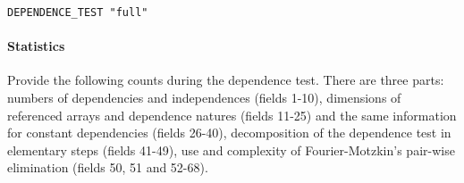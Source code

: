\begin{verbatim}
DEPENDENCE_TEST "full"
\end{verbatim}

\paragraph{Statistics}

Provide the following counts during the dependence test. There are three
parts: numbers of dependencies and independences (fields 1-10),
dimensions of referenced arrays and dependence natures (fields 11-25)
and the same information for constant dependencies (fields 26-40),
decomposition of the dependence test in elementary steps (fields 41-49),
use and complexity of Fourier-Motzkin's pair-wise elimination (fields
50, 51 and 52-68).

